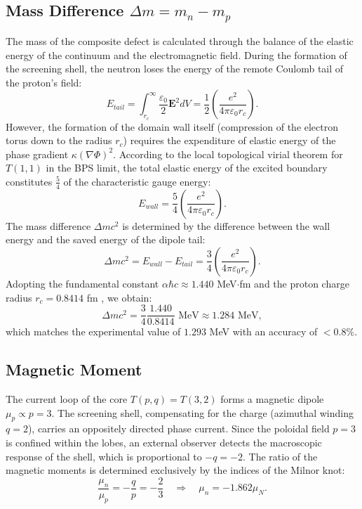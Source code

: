 \documentclass[12pt,a4paper]{article}
\begin{document}
\subsection{Mass Difference $\Delta m = m_n - m_p$}
The mass of the composite defect is calculated through the balance of the elastic energy of the continuum and the electromagnetic field. During the formation of the screening shell, the neutron loses the energy of the remote Coulomb tail of the proton's field:
\begin{equation}
E_{tail} = \int_{r_c}^{\infty} \frac{\varepsilon_0}{2} \mathbf{E}^2 dV = \frac{1}{2} \left( \frac{e^2}{4\pi\varepsilon_0 r_c} \right).
\end{equation}
However, the formation of the domain wall itself (compression of the electron torus down to the radius $r_c$) requires the expenditure of elastic energy of the phase gradient $\kappa(\nabla\Phi)^2$. According to the local topological virial theorem for $T(1,1)$ in the BPS limit, the total elastic energy of the excited boundary constitutes $\frac{5}{4}$ of the characteristic gauge energy:
\begin{equation}
E_{wall} = \frac{5}{4} \left( \frac{e^2}{4\pi\varepsilon_0 r_c} \right).
\end{equation}
The mass difference $\Delta m c^2$ is determined by the difference between the wall energy and the saved energy of the dipole tail:
\begin{equation}
\Delta m c^2 = E_{wall} - E_{tail} = \frac{3}{4} \left( \frac{e^2}{4\pi\varepsilon_0 r_c} \right).
\label{eq:deltam}
\end{equation}
Adopting the fundamental constant $\alpha \hbar c \approx 1.440$ MeV$\cdot$fm and the proton charge radius $r_c = 0.8414$ fm \cite{codata2018}, we obtain:
\begin{equation}
\Delta m c^2 = \frac{3}{4} \frac{1.440}{0.8414} \text{ MeV} \approx 1.284 \text{ MeV},
\end{equation}
which matches the experimental value of $1.293$ MeV with an accuracy of $<0.8\%$.

\subsection{Magnetic Moment}
The current loop of the core $T(p,q)=T(3,2)$ forms a magnetic dipole $\mu_p \propto p = 3$. The screening shell, compensating for the charge (azimuthal winding $q=2$), carries an oppositely directed phase current. Since the poloidal field $p=3$ is confined within the lobes, an external observer detects the macroscopic response of the shell, which is proportional to $-q = -2$. The ratio of the magnetic moments is determined exclusively by the indices of the Milnor knot:
\begin{equation}
\frac{\mu_n}{\mu_p} = -\frac{q}{p} = -\frac{2}{3} \quad \Longrightarrow \quad \mu_n = -1.862 \mu_N.
\end{equation}
\end{document}
